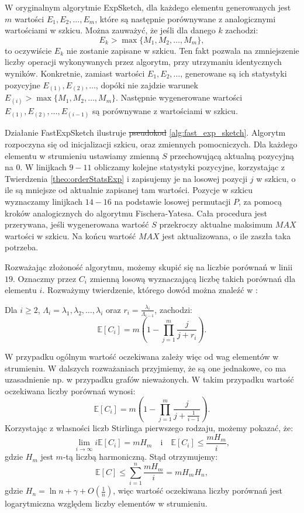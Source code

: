     W oryginalnym algorytmie ExpSketch, dla każdego elementu generowanych jest $m$ wartości $E_{1}, E_{2}, \dots, E_{m}$, które są następnie porównywane z analogicznymi wartościami w szkicu. Można zauważyć, że jeśli dla danego $k$ zachodzi:
    \[
        E_{k} > \max{\{M_1, M_2, \dots, M_m\}},     
    \]
    to oczywiście $E_{k}$ nie zostanie zapisane w szkicu. Ten fakt pozwala na zmniejszenie liczby operacji wykonywanych przez algorytm, przy utrzymaniu identycznych wyników. Konkretnie, zamiast wartości $E_{1}, E_{2}, \dots$, generowane są ich statystyki pozycyjne $E_{(1)}, E_{(2)}, \dots$, dopóki nie zajdzie warunek $E_{(i)} > \max{\{M_1, M_2, \dots, M_m\}}$. Następnie wygenerowane wartości $E_{(1)}, E_{(2)}, \dots, E_{(i - 1)}$ są porównywane z wartościami w szkicu. 
    
    Działanie FastExpSketch ilustruje \sout{pseudokod}  \ref{alg:fast_exp_sketch}. Algorytm rozpoczyna się od inicjalizacji szkicu, oraz zmiennych pomocniczych. Dla każdego elementu w strumieniu ustawiamy zmienną $S$ przechowującą aktualną pozycyjną na $0$. W linijkach $9-11$ obliczamy kolejne statystyki pozycyjne, korzystając z Twierdzenia \ref{theo:orderStatsExp} i zapisujemy je na losowej pozycji $j$ w szkicu, o ile są mniejsze od aktualnie zapisanej tam wartości. Pozycje w  szkicu wyznaczamy linijkach $14-16$ na podstawie losowej permutacji $P$, za pomocą kroków analogicznych do algorytmu Fischera-Yatesa. Cała procedura jest przerywana, jeśli wygenerowana wartość $S$ przekroczy aktualne maksimum $MAX$ wartości w szkicu. Na końcu wartość $MAX$ jest aktualizowana, o ile zaszła taka potrzeba.

    Rozważając złożoność algorytmu, możemy skupić się na liczbie porównań w linii $19$. Oznaczmy przez $C_i$ zmienną losową wyznaczającą liczbę takich porównań dla elementu $i$. Rozważymy twierdzenie, którego dowód można znaleźć w \cite{Lemiesz_2023}:
    \begin{twierdzenie}
        \label{theo:avgComp}        
        Dla $i \geq 2$, $\Lambda_{i} = \lambda_{1}, \lambda_{2}, \dots, \lambda_{i}$ oraz $r_i = \frac{\lambda_{i}}{\Lambda_{i - 1}}$, zachodzi:
        \[
            \mathbb{E}[C_i] = m \left( 1 - \prod_{j = 1}^{m} \frac{j}{j + r_i} \right).   
        \]
    \end{twierdzenie}
    W przypadku ogólnym wartość oczekiwana zależy więc od wag elementów w strumieniu. W dalszych rozważaniach przyjmiemy, że są one jednakowe, co ma uzasadnienie np. w przypadku grafów nieważonych. W takim przypadku wartość oczekiwana liczby porównań wynosi: 
    \[
        \mathbb{E}[C_i] = m \left( 1 - \prod_{j = 1}^{m} \frac{j}{j + \frac{1}{i - 1}} \right) .
    \]
    Korzystając z własności liczb Stirlinga pierwszego rodzaju, możemy pokazać, że:
    \[
        \lim_{i \to \infty} i \mathbb{E}[C_i] = m H_m \quad \text{i} \quad \mathbb{E}[C_i] \leq \frac{m H_m}{i},
    \]
    gdzie $H_m$ jest $m$-tą liczbą harmoniczną. Stąd otrzymujemy:
    \[
        \mathbb{E}[C] \leq \sum\limits_{i = 1}^{n} \frac{m H_m}{i} = m H_m H_n,
    \]
    gdzie $H_n = \ln n + \gamma + O(\frac{1}{n})$, więc wartość oczekiwana liczby porównań jest logarytmiczna względem liczby elementów w strumieniu.

